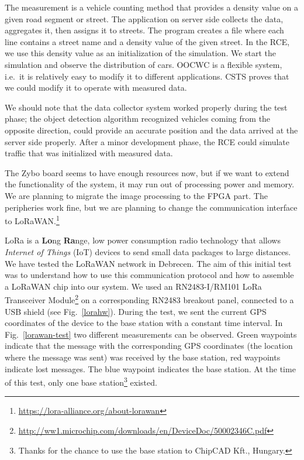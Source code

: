 \documentclass[b5paper,12pt]{report}
\theoremstyle{definition}
\begin{document}
The measurement is a vehicle counting method that provides a density value on a given road segment or street. The application on server side collects the data, aggregates it, then assigns it to streets. The program creates a file where each line contains a street name and a density value of the given street. In the RCE, we use this density value as an initialization of the simulation. We start the simulation and observe the distribution of cars. OOCWC is a flexible system, i.e.~it is relatively easy to modify it to different applications. CSTS proves that we could modify it to operate with measured data.

We should note that the data collector system worked properly during the test phase; the object detection algorithm recognized vehicles coming from the opposite direction, could provide an accurate position and the data arrived at the server side properly. After a minor development phase, the RCE could simulate traffic that was initialized with measured data.

The Zybo board seems to have enough resources now, but if we want to extend the functionality of the system, it may run out of processing power and memory. We are planning to migrate the image processing to the FPGA part. The peripheries work fine, but we are planning to change the communication interface to LoRaWAN.\footnote{\url{https://lora-alliance.org/about-lorawan}}

LoRa is a {{\bf Lo}}ng {{\bf Ra}}nge, low power consumption radio technology that allows \textit{Internet of Things} (IoT) devices to send small data packages to large distances. We have tested the LoRaWAN network in Debrecen. The aim of this initial test was to understand how to use this communication protocol and how to assemble a LoRaWAN chip into our system. We used an RN2483-I/RM101 LoRa Transceiver Module\footnote{\url{http://ww1.microchip.com/downloads/en/DeviceDoc/50002346C.pdf}} on a corresponding RN2483 breakout panel, connected to a USB shield (see Fig.~\ref{lorahw}). During the test, we sent the current GPS coordinates of the device to the base station with a constant time interval. In Fig.~\ref{lorawan-test} two different measurements can be observed. Green waypoints indicate that the message with the corresponding GPS coordinates (the location where the message was sent) was received by the base station, red waypoints indicate lost messages. The blue waypoint indicates the base station. At the time of this test, only one base station\footnote{Thanks for the chance to use the base station to ChipCAD Kft., Hungary.} existed.  
\end{document}
